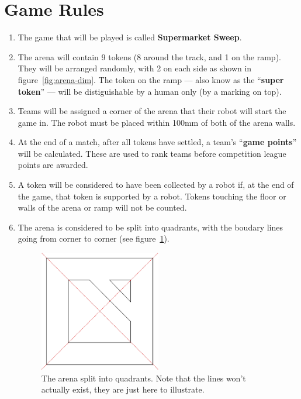 \section {Game Rules}
\label{game-rules}

\begin{enumerate}
\item The game that will be played is called \textbf{Supermarket Sweep}.
\item The arena will contain 9 tokens (8 around the track, and 1 on the ramp).  They will be arranged randomly, with 2 on each side as shown in figure~\ref{fig:arena-dim}.  The token on the ramp --- also know as the ``\textbf{super token}'' --- will be distiguishable by a human only (by a marking on top).
\item Teams will be assigned a corner of the arena that their robot will start the game in.  The robot must be placed within 100mm of both of the arena walls.
\item At the end of a match, after all tokens have settled, a team's ``\textbf{game points}'' will be calculated.
 These are used to rank teams before competition league points are awarded.
\item A token will be considered to have been collected by a robot if, at the end of the game, that token is supported by a robot.  Tokens touching the floor or walls of the arena or ramp will not be counted.

\item The arena is considered to be split into quadrants, with the boudary lines going from corner to corner (see figure~\ref{fig:quadrants}).

\begin{figure}
\begin{center}
  \includegraphics[keepaspectratio, clip, width=0.5\textwidth]{./images/quadrants.pdf}
  \caption{\label{fig:quadrants}The arena split into quadrants. Note that the lines won't actually exist, they are just here to illustrate.}
\end{center}
\end{figure}


\end{enumerate}
